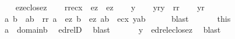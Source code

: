 \begin{isabellebody}
\ \ \isamarkupfalse%
\ {\isacharquery}{\kern0pt}ez{\isacharequal}{\kern0pt}{\isachardoublequoteopen}eclose{\isacharparenleft}{\kern0pt}{\isacharbraceleft}{\kern0pt}z{\isacharbraceright}{\kern0pt}{\isacharparenright}{\kern0pt}{\isachardoublequoteclose}\isanewline
\ \ \isamarkupfalse%
\ {\isacharquery}{\kern0pt}rr{\isacharequal}{\kern0pt}{\isachardoublequoteopen}{\isacharquery}{\kern0pt}ec{\isacharparenleft}{\kern0pt}x{\isacharparenright}{\kern0pt}\ {\isasyminter}\ {\isacharquery}{\kern0pt}ez\ {\isasymtimes}\ {\isacharquery}{\kern0pt}ez{\isachardoublequoteclose}\isanewline
\ \ \isamarkupfalse%
\ y\isanewline
\ \ \isamarkupfalse%
\ yr{\isacharcolon}{\kern0pt}{\isachardoublequoteopen}y\ {\isasymin}\ {\isacharquery}{\kern0pt}rr{\isachardoublequoteclose}\isanewline
\ \ \isamarkupfalse%
\ yr\ \isamarkupfalse%
\ a\ b\ \ {}{\isacharcolon}{\kern0pt}{\isachardoublequoteopen}{\isasymlangle}a{\isacharcomma}{\kern0pt}b{\isasymrangle}\ {\isasymin}\ {\isacharquery}{\kern0pt}rr{\isachardoublequoteclose}\ {\isachardoublequoteopen}a\ {\isasymin}\ {\isacharquery}{\kern0pt}ez{\isachardoublequoteclose}\ {\isachardoublequoteopen}b\ {\isasymin}\ {\isacharquery}{\kern0pt}ez{\isachardoublequoteclose}\ {\isachardoublequoteopen}{\isasymlangle}a{\isacharcomma}{\kern0pt}b{\isasymrangle}\ {\isasymin}\ {\isacharquery}{\kern0pt}ec{\isacharparenleft}{\kern0pt}x{\isacharparenright}{\kern0pt}{\isachardoublequoteclose}\ {\isachardoublequoteopen}y{\isacharequal}{\kern0pt}{\isasymlangle}a{\isacharcomma}{\kern0pt}b{\isasymrangle}{\isachardoublequoteclose}\isanewline
\ \ \ \ \isamarkupfalse%
\ blast\isanewline
\ \ \isamarkupfalse%
\isanewline
\ \ \isamarkupfalse%
\ this\isanewline
\ \ \isamarkupfalse%
\ {\isachardoublequoteopen}a\ {\isasymin}\ domain{\isacharparenleft}{\kern0pt}b{\isacharparenright}{\kern0pt}{\isachardoublequoteclose}\ \isamarkupfalse%
\ edrelD\ \isamarkupfalse%
\ blast\isanewline
\ \ \isamarkupfalse%
\isanewline
\ \ \isamarkupfalse%
\ {\isachardoublequoteopen}y\ {\isasymin}\ edrel{\isacharparenleft}{\kern0pt}eclose{\isacharparenleft}{\kern0pt}{\isacharbraceleft}{\kern0pt}z{\isacharbraceright}{\kern0pt}{\isacharparenright}{\kern0pt}{\isacharparenright}{\kern0pt}{\isachardoublequoteclose}\ \isamarkupfalse%
\ blast\isanewline
{}\isamarkupfalse%
\isanewline
\ \ \isamarkupfalse%

\end{isabellebody}
